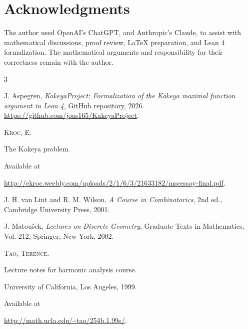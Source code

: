 \documentclass[11pt, letterpaper]{nyjm}
\begin{document}
	
	
	\section*{Acknowledgments}
	
	The author used OpenAI's ChatGPT, and Anthropic's Claude, to assist with
	mathematical discussions, proof review, LaTeX
	preparation, and Lean 4 formalization.
	The mathematical arguments and responsibility
	for their correctness remain with the author.
	
	\begin{thebibliography}{3}
		
		J. Aspegren,
		\emph{KakeyaProject: Formalization of the Kakeya maximal function argument in Lean 4},
		GitHub repository, 2026.
		\url{https://github.com/joas165/KakeyaProject}.
		
		
		
		{\scshape Kroc, E.} 
		
		The Kakeya problem. 
		
		Available at 
		
		\url{http://ekroc.weebly.com/uploads/2/1/6/3/21633182/mscessay-final.pdf}.
		
		J. H. van Lint and R. M. Wilson,
		\textit{A Course in Combinatorics},
		2nd ed., Cambridge University Press, 2001.
		
		J. Matou\v{s}ek,
		\textit{Lectures on Discrete Geometry},
		Graduate Texts in Mathematics, Vol. 212,
		Springer, New York, 2002.
		
		
		{\scshape Tao, Terence.}
		
		Lecture notes for harmonic analysis course. 
		
		University of California, Los Angeles, 1999. 
		
		Available at 
		
		\url{http://math.ucla.edu/~tao/254b.1.99s/}.
		
		
		
		
	\end{thebibliography}
	
	
	
\end{document}
